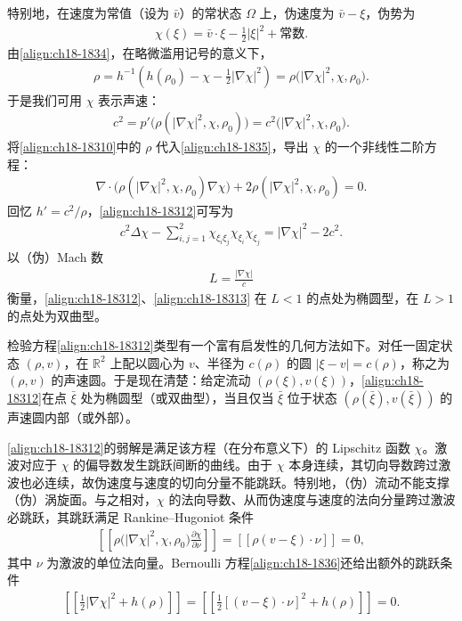 \documentclass[../../main.tex]{subfiles}
\begin{document}
特别地，在速度为常值（设为 $\bar v$）的常状态 $\Omega$ 上，伪速度为 $\bar v-\xi$，伪势为
\begin{align}
\chi(\xi)=\bar v\cdot\xi-\frac12|\xi|^2+\text{常数}.
\label{align:ch18-1839}
\end{align}
由\eqref{align:ch18-1834}，在略微滥用记号的意义下，
\begin{align}
\rho=h^{-1}\!\left(h(\rho_0)-\chi-\frac12|\nabla\chi|^2\right)=\rho\bigl(|\nabla\chi|^2,\chi,\rho_0\bigr).
\label{align:ch18-18310}
\end{align}
于是我们可用 $\chi$ 表示声速：
\begin{align}
c^2=p'\bigl(\rho(|\nabla\chi|^2,\chi,\rho_0)\bigr)=c^2\bigl(|\nabla\chi|^2,\chi,\rho_0\bigr).
\label{align:ch18-18311}
\end{align}
将\eqref{align:ch18-18310}中的 $\rho$ 代入\eqref{align:ch18-1835}，导出 $\chi$ 的一个非线性二阶方程：
\begin{align}
\nabla\cdot\bigl(\rho(|\nabla\chi|^2,\chi,\rho_0)\nabla\chi\bigr)+2\rho(|\nabla\chi|^2,\chi,\rho_0)=0.
\label{align:ch18-18312}
\end{align}
回忆 $h'=c^2/\rho$，\eqref{align:ch18-18312}可写为
\begin{align}
c^2\Delta\chi-\sum_{i,j=1}^2\chi_{\xi_i\xi_j}\chi_{\xi_i}\chi_{\xi_j}=|\nabla\chi|^2-2c^2.
\label{align:ch18-18313}
\end{align}
以（伪）Mach 数
\begin{align}
L=\frac{|\nabla\chi|}{c}
\label{align:ch18-18314}
\end{align}
衡量，\eqref{align:ch18-18312}、\eqref{align:ch18-18313} 在 $L<1$ 的点处为椭圆型，在 $L>1$ 的点处为双曲型。

检验方程\eqref{align:ch18-18312}类型有一个富有启发性的几何方法如下。对任一固定状态 $(\rho,v)$，在 $\mathbb{R}^2$ 上配以圆心为 $v$、半径为 $c(\rho)$ 的圆 $|\xi-v|=c(\rho)$，称之为 $(\rho,v)$ 的声速圆。于是现在清楚：给定流动 $(\rho(\xi),v(\xi))$，\eqref{align:ch18-18312}在点 $\bar\xi$ 处为椭圆型（或双曲型），当且仅当 $\bar\xi$ 位于状态 $(\rho(\bar\xi),v(\bar\xi))$ 的声速圆内部（或外部）。

\eqref{align:ch18-18312}的弱解是满足该方程（在分布意义下）的 Lipschitz 函数 $\chi$。激波对应于 $\chi$ 的偏导数发生跳跃间断的曲线。由于 $\chi$ 本身连续，其切向导数跨过激波也必连续，故伪速度与速度的切向分量不能跳跃。特别地，（伪）流动不能支撑（伪）涡旋面。与之相对，$\chi$ 的法向导数、从而伪速度与速度的法向分量跨过激波必跳跃，其跳跃满足 Rankine--Hugoniot 条件
\begin{align}
\left[\!\left[\rho\bigl(|\nabla\chi|^2,\chi,\rho_0\bigr)\frac{\partial\chi}{\partial\nu}\right]\!\right]
=[\![\rho(v-\xi)\cdot\nu]\!]=0,
\label{align:ch18-18315}
\end{align}
其中 $\nu$ 为激波的单位法向量。Bernoulli 方程\eqref{align:ch18-1836}还给出额外的跳跃条件
\begin{align}
\left[\!\left[\frac12|\nabla\chi|^2+h(\rho)\right]\!\right]
=\left[\!\left[\frac12[(v-\xi)\cdot\nu]^2+h(\rho)\right]\!\right]=0.
\label{align:ch18-18316}
\end{align}
\end{document}
